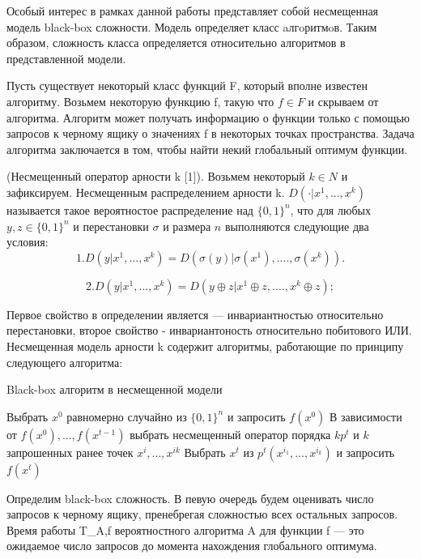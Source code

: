 Особый интерес в рамках данной работы представляет собой несмещенная модель black-box сложности. Модель определяет класс aлгoритмoв. Таким образом, сложность класса определяется относительно алгоритмов в представленной модели.

Пусть существует некоторый класс функций F, который вполне известен алгоритму. Возьмем некоторую функцию f, такую что $f \in F$ и скрываем от алгоритма. Алгоритм может получать информацию о функции только с помощью запросов к черному ящику о значениях f в некоторых точках пространства. Задача алгоритма заключается в том, чтобы найти некий глобальный оптимум функции.


\begin{definition}
(Несмещенный оператор арности k [1]). Возьмем некоторый
$k \in  N$ и зафиксируем. Несмещенным распределением арности k. $ D (\cdot | x^{1}, ..., x^k)$  называется такое вероятностое распределение над $\{0, 1\}^{n}$, что для любых $y,z \in \{0, 1 \}^n$ и перестановки $\sigma$ и размера $n$ выполняются следующие два условия:
 $$ 1. D ( y | x^{1},..., x^{k} ) = D(\sigma(y) | \sigma(x^{1}),...., \sigma(x^{k})).$$

 $$ 2. D ( y | x^{1},..., x^{k} ) = D(y \oplus z | x^{1} \oplus z,...., x^{k} \oplus z);$$ 

\end{definition}

Первое свойство в определении является — инвариантностью относительно перестановки, второе свойство - инвариантоность относительно побитового ИЛИ. Несмещенная модель арности k содержит алгоритмы, работающие по принципу следующего алгоритма:

\begin{algorithm}[H]
\caption{Black-box алгоритм в несмещенной модели}\label{lst1}
\begin{algorithmic}
        \State Выбрать $x^0$ равномерно случайно из $\{0,1\}^n$ и запросить $f(x^0)$  
	    \State В зависимости от $f(x^0),...,f(x^{t-1})$ выбрать несмещенный оператор порядка $k p^t$ и $k$ запрошенных ранее точек $x^i,...,x^{ik}$
	    \State Выбрать $x^t$ из $p^{t} (x^{i_1},...,x^{i_k})$ и запросить $f(x^t)$
		\EndFor
\end{algorithmic}
\end{algorithm}

Определим black-box сложность. В певую очередь будем оценивать число запросов к черному ящику, пренебрегая сложностью всех остальных запросов. Время работы T_{A,f} вероятностного алгоритма A для функции f — это ожидаемое число запросов до момента нахождения глобального оптимума.

